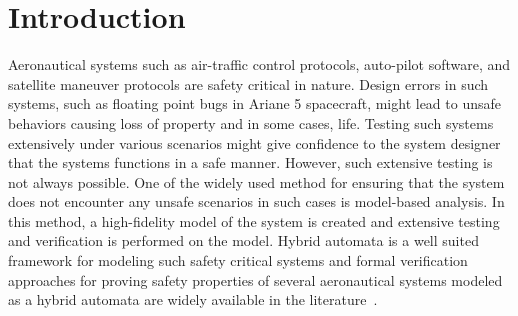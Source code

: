 \section{Introduction}
\label{sec:intro}

Aeronautical systems such as air-traffic control protocols, auto-pilot software, and satellite maneuver protocols are safety critical in nature.
%
Design errors in such systems, such as floating point bugs in Ariane 5 spacecraft, might lead to unsafe behaviors causing loss of property and in some cases, life.
%
Testing such systems extensively under various scenarios might give confidence to the system designer that the systems functions in a safe manner.
%
However, such extensive testing is not always possible. 
%
%
%
%
%
One of the widely used method for ensuring that the system does not encounter any unsafe scenarios in such cases is model-based analysis.
%
In this method, a high-fidelity model of the system is created and extensive testing and verification is performed on the model.
%
%
% 
% 
Hybrid automata is a well suited framework for modeling such safety critical systems and formal verification approaches for proving safety properties of several aeronautical systems modeled as a hybrid automata are widely available in the literature~\cite{tomlin1998conflict,pallottino2002conflict,prabhakar2009verifying,johnson2012satellite,munoz2013tcas,zhao2014formal,duggirala2014temporal,jeannin2015formally}.
%
%
%
%

